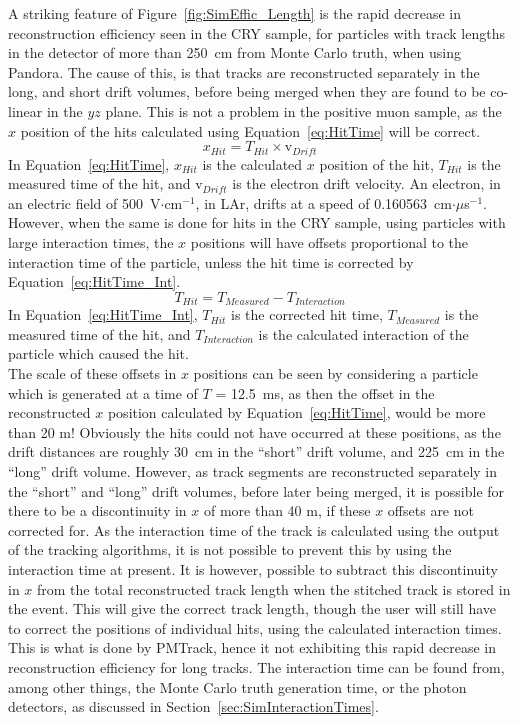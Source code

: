A striking feature of Figure~\ref{fig:SimEffic_Length} is the rapid decrease in reconstruction efficiency seen in the CRY sample, for particles with track lengths in the detector of more than 250~cm from Monte Carlo truth, when using Pandora. The cause of this, is that tracks are reconstructed separately in the long, and short drift volumes, before being merged when they are found to be co-linear in the $yz$ plane. This is not a problem in the positive muon sample, as the $x$ position of the hits calculated using Equation~\ref{eq:HitTime} will be correct.
\begin{equation}
   \label{eq:HitTime}
   x_{Hit} = T_{Hit} \times \text{v}_{Drift}
\end{equation}
In Equation~\ref{eq:HitTime}, $x_{Hit}$ is the calculated $x$ position of the hit, $T_{Hit}$ is the measured time of the hit, and v$_{Drift}$ is the electron drift velocity. An electron, in an electric field of 500~V$\cdot$cm$^{-1}$, in LAr, drifts at a speed of 0.160563~cm$\cdot\mu$s$^{-1}$. However, when the same is done for hits in the CRY sample, using particles with large interaction times, the $x$ positions will have offsets proportional to the interaction time of the particle, unless the hit time is corrected by Equation~\ref{eq:HitTime_Int}.
\begin{equation}
   \label{eq:HitTime_Int}
   T_{Hit} = T_{Measured} - T_{Interaction}
\end{equation}
In Equation~\ref{eq:HitTime_Int}, $T_{Hit}$ is the corrected hit time, $T_{Measured}$ is the measured time of the hit, and $T_{Interaction}$ is the calculated interaction of the particle which caused the hit. \\

The scale of these offsets in $x$ positions can be seen by considering a particle which is generated at a time of $T$ = 12.5~ms, as then the offset in the reconstructed $x$ position calculated by Equation~\ref{eq:HitTime}, would be more than 20 m! Obviously the hits could not have occurred at these positions, as the drift distances are roughly 30~cm in the ``short'' drift volume, and 225~cm in the ``long'' drift volume. However, as track segments are reconstructed separately in the ``short'' and ``long'' drift volumes, before later being merged, it is possible for there to be a discontinuity in $x$ of more than 40 m, if these $x$ offsets are not corrected for. As the interaction time of the track is calculated using the output of the tracking algorithms, it is not possible to prevent this by using the interaction time at present. It is however, possible to subtract this discontinuity in $x$ from the total reconstructed track length when the stitched track is stored in the event. This will give the correct track length, though the user will still have to correct the positions of individual hits, using the calculated interaction times. This is what is done by PMTrack, hence it not exhibiting this rapid decrease in reconstruction efficiency for long tracks. The interaction time can be found from, among other things, the Monte Carlo truth generation time, or the photon detectors, as discussed in Section~\ref{sec:SimInteractionTimes}.\\

